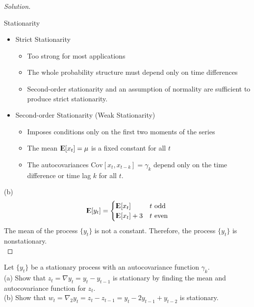 \documentclass[UTF8,a4paper,14pt]{ctexart}
\newcommand{\E}{{\rm I\kern-.3em E}}
\newcommand{\Cov}{\mathrm{Cov}}
\newenvironment{solution}
  {\renewcommand\qedsymbol{$\blacksquare$}\begin{proof}[Solution]}
  {\end{proof}}
\theoremstyle{definition}
\theoremstyle{remark}
\begin{document}
\begin{solution}
    \begin{mybox}{Stationarity}
        \begin{itemize}
            \item Strict Stationarity
                \begin{itemize}
                    \item Too strong for most applications
                    \item The whole
                    probability structure must depend only on time differences
                    \item Second-order stationarity and an assumption of normality are sufficient to produce strict stationarity.
                \end{itemize}
            \item Second-order Stationarity (Weak Stationarity)
                \begin{itemize}
                    \item Imposes conditions only on the first two moments of the series
                \item The mean $\E[x_t] = \mu$ is a fixed constant for all $t$
                \item The autocovariances $\Cov[x_t,x_{t-k}] = \gamma_k$ depend only on the time difference or time lag $k$ for all $t$.
            \end{itemize}
        \end{itemize}
    \end{mybox}

    (b)\\
    \begin{align*}
        \E[y_t] = \begin{cases}
            \E[x_t]&\text{$t$ odd}\\
            \E[x_t]+3&\text{$t$ even}\\
        \end{cases}
    \end{align*}
    The mean of the process $\{y_t\}$ is not a constant. Therefore, the process $\{y_t\}$ is nonstationary.\\
\end{solution}
\pagebreak
\begin{Problem}{}
    Let $\{y_t\}$ be a stationary process with an autocovariance function $\gamma_k$.\\[6pt]
(a) Show that $z_t = \nabla y_t = y_t - y_{t-1}$ is stationary by finding the mean and autocovariance function for $z_t$.\\
(b) Show that $w_t = \nabla_2 y_t = z_t - z_{t-1} = y_t - 2y_{t-1} + y_{t-2}$ is stationary.
\end{Problem}
\end{document}
